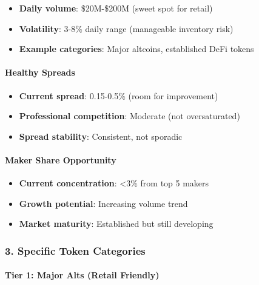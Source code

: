 \begin{itemize}
\tightlist
\item
  \textbf{Daily volume}: \$20M-\$200M (sweet spot for retail)
\item
  \textbf{Volatility}: 3-8\% daily range (manageable inventory risk)
\item
  \textbf{Example categories}: Major altcoins, established DeFi tokens
\end{itemize}

\hypertarget{healthy-spreads}{%
\paragraph{\texorpdfstring{\textbf{Healthy
Spreads}}{Healthy Spreads}}\label{healthy-spreads}}

\begin{itemize}
\tightlist
\item
  \textbf{Current spread}: 0.15-0.5\% (room for improvement)
\item
  \textbf{Professional competition}: Moderate (not oversaturated)
\item
  \textbf{Spread stability}: Consistent, not sporadic
\end{itemize}

\hypertarget{maker-share-opportunity}{%
\paragraph{\texorpdfstring{\textbf{Maker Share
Opportunity}}{Maker Share Opportunity}}\label{maker-share-opportunity}}

\begin{itemize}
\tightlist
\item
  \textbf{Current concentration}: \textless3\% from top 5 makers
\item
  \textbf{Growth potential}: Increasing volume trend
\item
  \textbf{Market maturity}: Established but still developing
\end{itemize}

\hypertarget{specific-token-categories}{%
\subsubsection{\texorpdfstring{3. \textbf{Specific Token
Categories}}{3. Specific Token Categories}}\label{specific-token-categories}}

\hypertarget{tier-1-major-alts-retail-friendly}{%
\paragraph{\texorpdfstring{\textbf{Tier 1: Major Alts (Retail
Friendly)}}{Tier 1: Major Alts (Retail Friendly)}}\label{tier-1-major-alts-retail-friendly}}

